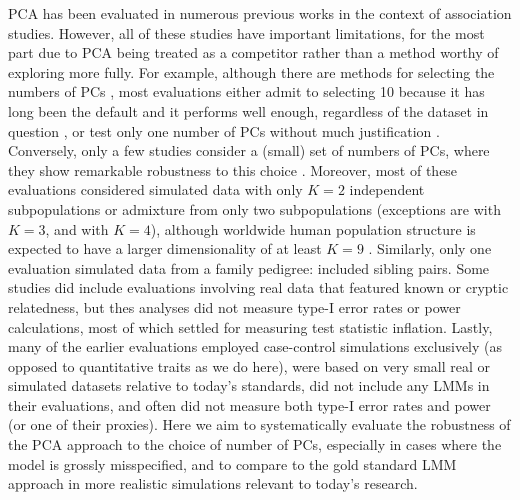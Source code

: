 \documentclass[11pt]{article}
\begin{document}
PCA has been evaluated in numerous previous works in the context of association studies.
However, all of these studies have important limitations, for the most part due to PCA being treated as a competitor rather than a method worthy of exploring more fully.
For example, although there are methods for selecting the numbers of PCs \citep{patterson_population_2006}, most evaluations either admit to selecting 10 because it has long been the default and it performs well enough, regardless of the dataset in question \citep{epstein_simple_2007, li_improved_2008, astle_population_2009, li_correcting_2010, wu_comparison_2011}, or test only one number of PCs without much justification \citep{zhang_semiparametric_2003, kimmel_randomization_2007, zhao_arabidopsis_2007, zhang_comparison_2008, price_new_2010, bouaziz_accounting_2011, hoffman_correcting_2013, wang_analytical_2013, tucker_improving_2014, yang_advantages_2014, sul_population_2018}.
Conversely, only a few studies consider a (small) set of numbers of PCs, where they show remarkable robustness to this choice \citep{price_principal_2006, kang_variance_2010, wojcik_genetic_2019}.
Moreover, most of these evaluations considered simulated data with only $K = 2$ independent subpopulations or admixture from only two subpopulations (exceptions are \citet{astle_population_2009} with $K=3$, and \citet{wang_analytical_2013} with $K = 4$), although worldwide human population structure is expected to have a larger dimensionality of at least $K = 9$ \citep{wojcik_genetic_2019}.
Similarly, only one evaluation simulated data from a family pedigree: \citet{price_new_2010} included sibling pairs.
Some studies did include evaluations involving real data that featured known or cryptic relatedness, but thes analyses did not measure type-I error rates or power calculations, most of which settled for measuring test statistic inflation.
Lastly, many of the earlier evaluations employed case-control simulations exclusively (as opposed to quantitative traits as we do here), were based on very small real or simulated datasets relative to today's standards, did not include any LMMs in their evaluations, and often did not measure both type-I error rates and power (or one of their proxies).
Here we aim to systematically evaluate the robustness of the PCA approach to the choice of number of PCs, especially in cases where the model is grossly misspecified, and to compare to the gold standard LMM approach in more realistic simulations relevant to today's research.
\end{document}
